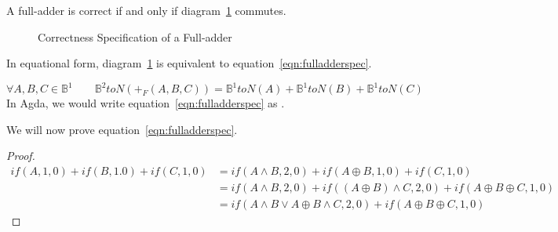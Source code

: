 \documentclass[14pt]{extarticle}  %
\theoremstyle{plain}
\theoremstyle{definition}
\theoremstyle{remark}
\begin{document}
A full-adder is correct if and only if diagram~\ref{fig:fulladder} commutes.
\begin{figure}[h]
\centering
\caption{Correctness Specification of a Full-adder}
\label{fig:fulladder}
\end{figure}

In equational form, diagram~\ref{fig:fulladder} is equivalent to equation~\ref{eqn:fulladderspec}.

\begin{equation}\label{eqn:fulladderspec}
  \forall A,B, C \in \mathbb{B}^{1} \qquad \mathbb{B}^{2}toN(+_{F}(A,B,C)) = \mathbb{B}^{1}toN(A) + \mathbb{B}^{1}toN(B)+\mathbb{B}^{1}toN(C)
\end{equation}
 In Agda, we would write equation~\ref{eqn:fulladderspec} as .

We will now prove equation~\ref{eqn:fulladderspec}.

\begin{proof}
  \begin{align}
    if(A,1,0) + if(B,1.0) + if(C,1,0)
    &= if(A \land B , 2, 0) + if(A \oplus B, 1, 0) + if(C, 1, 0) \\
    &= if(A \land B , 2, 0) + if( (A \oplus B) \land C, 2, 0) + if(A \oplus B \oplus C, 1, 0) \\
    &= if( A \land B \lor A \oplus B \land C , 2 , 0 ) + if(A \oplus B \oplus C , 1, 0)
    \end{align}
\end{proof}
\end{document}
